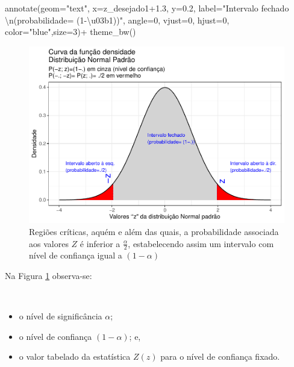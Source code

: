 \documentclass[
]{book}
\newenvironment{Shaded}{\begin{snugshade}}{\end{snugshade}}
\newcommand{\AttributeTok}[1]{\textcolor[rgb]{0.77,0.63,0.00}{#1}}
\newcommand{\DecValTok}[1]{\textcolor[rgb]{0.00,0.00,0.81}{#1}}
\newcommand{\FloatTok}[1]{\textcolor[rgb]{0.00,0.00,0.81}{#1}}
\newcommand{\FunctionTok}[1]{\textcolor[rgb]{0.00,0.00,0.00}{#1}}
\newcommand{\NormalTok}[1]{#1}
\newcommand{\SpecialCharTok}[1]{\textcolor[rgb]{0.00,0.00,0.00}{#1}}
\newcommand{\StringTok}[1]{\textcolor[rgb]{0.31,0.60,0.02}{#1}}
\providecommand{\tightlist}{%
  \setlength{\itemsep}{0pt}\setlength{\parskip}{0pt}}
\begin{document}
\begin{Shaded}
\begin{Highlighting}[]
  \FunctionTok{annotate}\NormalTok{(}\AttributeTok{geom=}\StringTok{"text"}\NormalTok{, }\AttributeTok{x=}\NormalTok{z\_desejado1}\FloatTok{+1.3}\NormalTok{, }\AttributeTok{y=}\FloatTok{0.2}\NormalTok{, }\AttributeTok{label=}\StringTok{"Intervalo fechado }\SpecialCharTok{\textbackslash{}n}\StringTok{(probabilidade= (1{-}\textbackslash{}u03b1))"}\NormalTok{, }\AttributeTok{angle=}\DecValTok{0}\NormalTok{, }\AttributeTok{vjust=}\DecValTok{0}\NormalTok{, }\AttributeTok{hjust=}\DecValTok{0}\NormalTok{, }\AttributeTok{color=}\StringTok{"blue"}\NormalTok{,}\AttributeTok{size=}\DecValTok{3}\NormalTok{)}\SpecialCharTok{+}
  \FunctionTok{theme\_bw}\NormalTok{()}
\end{Highlighting}
\end{Shaded}

\begin{figure}

{\centering \includegraphics[width=1\linewidth]{apostila_files/figure-latex/fig55-1} 

}

\caption{Regiões críticas, aquém e além das quais, a probabilidade associada aos valores $Z$ é inferior a $\frac{\alpha}{2}$, estabelecendo assim um intervalo com nível de confiança igual a $(1-\alpha)$}\label{fig:fig55}
\end{figure}

\hfill\break

Na Figura \ref{fig:fig55} observa-se:

~

\begin{itemize}
\tightlist
\item
  o nível de significância \(\alpha\);\\
\item
  o nível de confiança \((1-\alpha)\); e,\\
\item
  o valor tabelado da estatística \(Z(z)\) para o nível de confiança fixado.
\end{itemize}
\end{document}
